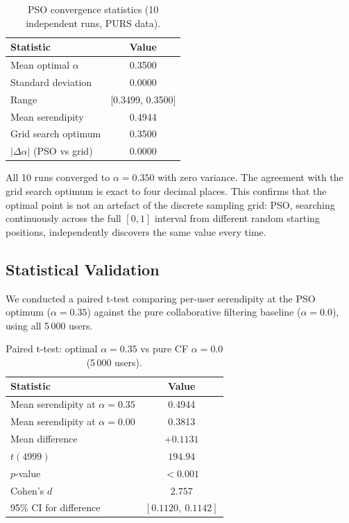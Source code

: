 \begin{table}[h]
\centering
\caption{PSO convergence statistics (10 independent runs, PURS data).}
\label{tab:pso_results}
\begin{tabular}{lc}
\toprule
\textbf{Statistic} & \textbf{Value} \\
\midrule
Mean optimal $\alpha$ & 0.3500 \\
Standard deviation    & 0.0000 \\
Range                 & [0.3499, 0.3500] \\
Mean serendipity      & 0.4944 \\
Grid search optimum   & 0.3500 \\
$|\Delta\alpha|$ (PSO vs grid) & 0.0000 \\
\bottomrule
\end{tabular}
\end{table}

All 10 runs converged to $\alpha = 0.350$ with zero variance.  The
agreement with the grid search optimum is exact to four decimal places.
This confirms that the optimal point is not an artefact of the discrete
sampling grid: PSO, searching continuously across the full $[0,1]$ interval
from different random starting positions, independently discovers the same
value every time.

\subsection{Statistical Validation}

We conducted a paired t-test comparing per-user serendipity at the PSO
optimum ($\alpha = 0.35$) against the pure collaborative filtering baseline
($\alpha = 0.0$), using all 5\,000 users.

\begin{table}[h]
\centering
\caption{Paired t-test: optimal $\alpha = 0.35$ vs pure CF $\alpha = 0.0$
         (5\,000 users).}
\label{tab:exp2_ttest}
\begin{tabular}{lc}
\toprule
\textbf{Statistic} & \textbf{Value} \\
\midrule
Mean serendipity at $\alpha = 0.35$ & 0.4944 \\
Mean serendipity at $\alpha = 0.00$ & 0.3813 \\
Mean difference                     & $+0.1131$ \\
$t(4999)$                           & $194.94$ \\
$p$-value                           & $< 0.001$ \\
Cohen's $d$                         & $2.757$ \\
95\% CI for difference              & $[0.1120,\ 0.1142]$ \\
\bottomrule
\end{tabular}
\end{table}

